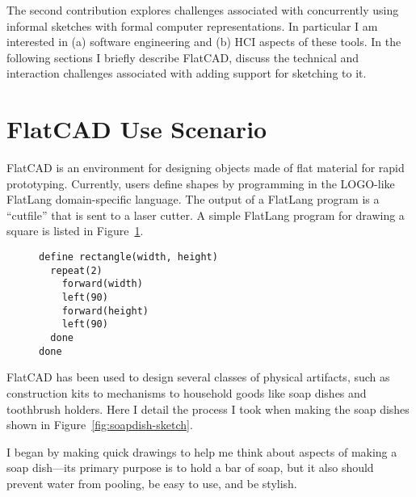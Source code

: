 \documentclass[times, 10pt, twocolumn]{article}
\makeatletter
\newenvironment{subfloat}%
{\def\caption##1{\gdef\subcapsave{\relax##1}}%
\let\subcapsave=\@empty %
\let\sf@oldlabel=\label 
\def\label##1{\xdef\sublabsave{\noexpand\label{##1}}}%
\let\sublabsave\relax %
\setbox\subfigbox\hbox 
\bgroup}%
{\egroup %
\let\label=\sf@oldlabel 
\subfigure[\subcapsave]{\box\subfigbox}}%
\makeatother
\begin{document}
The second contribution explores challenges associated with
concurrently using informal sketches with formal computer
representations. In particular I am interested in (a) software
engineering and (b) HCI aspects of these tools. In the following
sections I briefly describe FlatCAD, discuss the technical and
interaction challenges associated with adding support for sketching to
it.

\section{FlatCAD Use Scenario}


FlatCAD is an environment for designing objects made of flat material
for rapid prototyping. Currently, users define shapes by programming
in the LOGO-like FlatLang domain-specific language. The output of a
FlatLang program is a ``cutfile'' that is sent to a laser cutter. A
simple FlatLang program for drawing a square is listed in
Figure~\ref{fig:flatlang}.

\begin{figure}
  \centering 
  \begin{subfloat}%
    \begin{minipage}{1.8in} 
      \small
\begin{verbatim}
define rectangle(width, height)
  repeat(2)
    forward(width)
    left(90)
    forward(height)
    left(90)
  done
done
\end{verbatim}
    \end{minipage}
  \end{subfloat} 

  \caption{Very simple \nohyphens{FlatLang} code that draws a
    rectangle.}
  \label{fig:flatlang}
\end{figure} 

FlatCAD has been used to design several classes of physical artifacts,
such as construction kits to mechanisms to household goods like soap
dishes and toothbrush holders. Here I detail the process I took when
making the soap dishes shown in Figure~\ref{fig:soapdish-sketch}.

I began by making quick drawings to help me think about aspects of
making a soap dish---its primary purpose is to hold a bar of soap, but
it also should prevent water from pooling, be easy to use, and be
stylish. 
\end{document}
